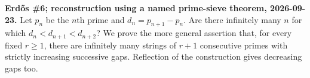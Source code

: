 \textbf{Erd\H{o}s \#6; reconstruction using a named prime-sieve theorem, 2026-09-23.}
Let $p_n$ be the $n$th prime and $d_n=p_{n+1}-p_n$. Are there infinitely many $n$ for which $d_n<d_{n+1}<d_{n+2}$? We prove the more general assertion that, for every fixed $r\ge1$, there are infinitely many strings of $r+1$ consecutive primes with strictly increasing successive gaps. Reflection of the construction gives decreasing gaps too.
